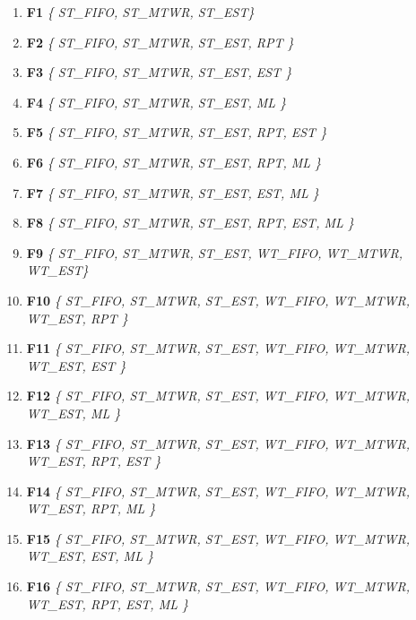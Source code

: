 \documentclass[runningheads]{llncs}
\newcommand{\stest}{\textit{ST\_EST}\xspace}
\newcommand{\stmtwr}{\textit{ST\_MTWR}\xspace}
\newcommand{\stfifo}{\textit{ST\_FIFO}\xspace}
\newcommand{\wtest}{\textit{WT\_EST}\xspace}
\newcommand{\wtmtwr}{\textit{WT\_MTWR}\xspace}
\newcommand{\wtfifo}{\textit{WT\_FIFO}\xspace}
\begin{document}
\begin{enumerate}[label=]
\fontsize{9pt}{10pt}
\item \textbf{F1} \textrightarrow{} \textit{\{ \stfifo, \stmtwr, \stest \}}
\item \textbf{F2} \textrightarrow{} \textit{\{ \stfifo, \stmtwr, \stest, RPT \}}
\item \textbf{F3} \textrightarrow{} \textit{\{ \stfifo, \stmtwr, \stest, EST \}} 
\item \textbf{F4} \textrightarrow{} \textit{\{ \stfifo, \stmtwr, \stest, ML \}} 
\item \textbf{F5} \textrightarrow{} \textit{\{ \stfifo, \stmtwr, \stest, RPT, EST \}}
\item \textbf{F6} \textrightarrow{} \textit{\{ \stfifo, \stmtwr, \stest, RPT, ML \}} 
\item \textbf{F7} \textrightarrow{} \textit{\{ \stfifo, \stmtwr, \stest, EST, ML \}}
\item  \textbf{F8} \textrightarrow{} \textit{\{ \stfifo, \stmtwr, \stest, RPT, EST, ML \}}
\item \textbf{F9} \textrightarrow{} \textit{\{ \stfifo, \stmtwr, \stest, \wtfifo, \wtmtwr, \wtest \}} 
\item \textbf{F10} \textrightarrow{} \textit{\{ \stfifo, \stmtwr, \stest, \wtfifo, \wtmtwr, \wtest, RPT \}} 
\item \textbf{F11} \textrightarrow{} \textit{\{ \stfifo, \stmtwr, \stest, \wtfifo, \wtmtwr, \wtest, EST \}} 
\item \textbf{F12} \textrightarrow{} \textit{\{ \stfifo, \stmtwr, \stest, \wtfifo, \wtmtwr, \wtest, ML \}}
\item \textbf{F13} \textrightarrow{} \textit{\{ \stfifo, \stmtwr, \stest, \wtfifo, \wtmtwr, \wtest, RPT, EST \}}
\item \textbf{F14} \textrightarrow{} \textit{\{ \stfifo, \stmtwr, \stest, \wtfifo, \wtmtwr, \wtest, RPT, ML \}}
\item \textbf{F15} \textrightarrow{} \textit{\{ \stfifo, \stmtwr, \stest, \wtfifo, \wtmtwr, \wtest, EST, ML \}}
\item \textbf{F16} \textrightarrow{} \textit{\{ \stfifo, \stmtwr, \stest, \wtfifo, \wtmtwr, \wtest, RPT, EST, ML \}}
\end{enumerate}
\end{document}
